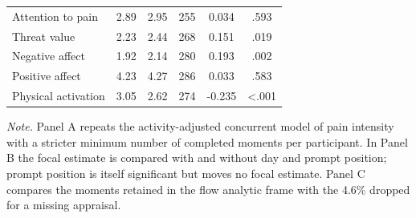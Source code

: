 \begin{table}[!htbp]
\begin{tabular*}{\textwidth}{@{\extracolsep{\fill}}lccccc@{}}
Attention to pain & 2.89 & 2.95 & 255 & 0.034 & .593 \\
Threat value & 2.23 & 2.44 & 268 & 0.151 & .019 \\
Negative affect & 1.92 & 2.14 & 280 & 0.193 & .002 \\
Positive affect & 4.23 & 4.27 & 286 & 0.033 & .583 \\
Physical activation & 3.05 & 2.62 & 274 & -0.235 & <.001 \\
\bottomrule
\end{tabular*}
\par\vspace{3pt}\noindent\parbox{\textwidth}{\footnotesize\textit{Note.} Panel A repeats the activity-adjusted concurrent model of pain intensity with a stricter minimum number of completed moments per participant. In Panel B the focal estimate is compared with and without day and prompt position; prompt position is itself significant but moves no focal estimate. Panel C compares the moments retained in the flow analytic frame with the 4.6\% dropped for a missing appraisal.}
\endgroup
\end{table}
